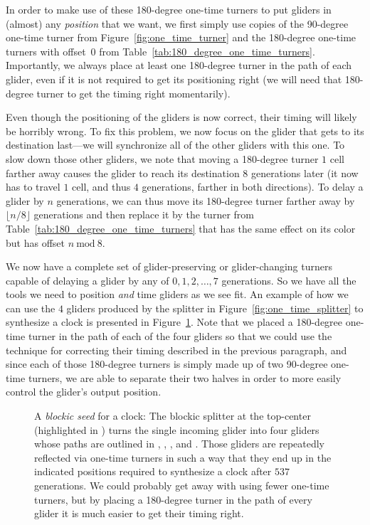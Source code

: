 In order to make use of these 180-degree one-time turners to put gliders in (almost) any \emph{position} that we want, we first simply use copies of the 90-degree one-time turner from Figure~\ref{fig:one_time_turner} and the 180-degree one-time turners with offset~0 from Table~\ref{tab:180_degree_one_time_turners}. Importantly, we always place at least one 180-degree turner in the path of each glider, even if it is not required to get its positioning right (we will need that 180-degree turner to get the timing right momentarily).

Even though the positioning of the gliders is now correct, their timing will likely be horribly wrong. To fix this problem, we now focus on the glider that gets to its destination last---we will synchronize all of the other gliders with this one. To slow down those other gliders, we note that moving a 180-degree turner $1$ cell farther away causes the glider to reach its destination $8$ generations later (it now has to travel $1$ cell, and thus $4$ generations, farther in both directions). To delay a glider by $n$ generations, we can thus move its 180-degree turner farther away by $\lfloor n/8 \rfloor$ generations and then replace it by the turner from Table~\ref{tab:180_degree_one_time_turners} that has the same effect on its color but has offset $n \ \text{mod} \ 8$.

We now have a complete set of glider-preserving or glider-changing turners capable of delaying a glider by any of $0,1,2,\ldots,7$ generations.  So we have all the tools we need to position \emph{and} time gliders as we see fit. An example of how we can use the $4$ gliders produced by the splitter in Figure~\ref{fig:one_time_splitter} to synthesize a clock is presented in Figure~\ref{fig:clock_slow_salvo}. Note that we placed a 180-degree one-time turner in the path of each of the four gliders so that we could use the technique for correcting their timing described in the previous paragraph, and since each of those 180-degree turners is simply made up of two 90-degree one-time turners, we are able to separate their two halves in order to more easily control the glider's output position.

\begin{figure}[!htb]
	\centering
	\caption{A \emph{blockic seed} for a clock: The blockic splitter at the top-center (highlighted in ) turns the single incoming glider into four gliders whose paths are outlined in , , , and . Those gliders are repeatedly reflected via one-time turners in such a way that they end up in the indicated positions required to synthesize a clock after $537$ generations. We could probably get away with using fewer one-time turners, but by placing a 180-degree turner in the path of every glider it is much easier to get their timing right.}
	\label{fig:clock_slow_salvo}
\end{figure}

